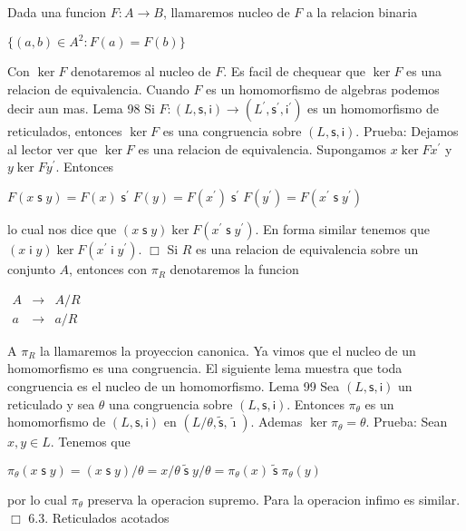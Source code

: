 Dada una funcion \(F:A\rightarrow B\), llamaremos nucleo de \(F\) a la relacion binaria

\(\displaystyle \{(a,b)\in A^{2}:F(a)=F(b)\} \)

Con \(\ker F\) denotaremos al nucleo de \(F\). Es facil de chequear que \(\ker F\) es una relacion de equivalencia. Cuando \(F\) es un homomorfismo de algebras podemos decir aun mas.
Lema 98 Si \(F:(L,\mathsf{s},\mathsf{i})\rightarrow (L^{\prime },\mathsf{s}^{\prime }, \mathsf{i}^{\prime })\) es un homomorfismo de reticulados, entonces \(\ker F\) es una congruencia sobre \((L,\mathsf{s},\mathsf{i})\).
Prueba: Dejamos al lector ver que \(\ker F\) es una relacion de equivalencia. Supongamos \(x\ker Fx^{\prime }\) y \(y\ker Fy^{\prime }\). Entonces

\(\displaystyle F(x\mathsf{\;s\;}y)=F(x)\mathsf{\;s^{\prime }\;}F(y)=F(x^{\prime })\mathsf{ \;s^{\prime }\;}F(y^{\prime })=F(x^{\prime }\mathsf{\;s\;}y^{\prime }) \)

lo cual nos dice que \((x\mathsf{\;s\;}y)\ker F(x^{\prime }\mathsf{\;s\;} y^{\prime })\). En forma similar tenemos que \((x\mathsf{\;i\;}y)\ker F(x^{\prime }\mathsf{\;i\;}y^{\prime })\). \(\Box\)
Si \(R\) es una relacion de equivalencia sobre un conjunto \(A\), entonces con \( \pi _{R}\) denotaremos la funcion

\(\displaystyle \begin{array}{ccc} A & \rightarrow & A/R \\ a & \rightarrow & a/R \end{array} \)

A \(\pi _{R}\) la llamaremos la proyeccion canonica. Ya vimos que el nucleo de un homomorfismo es una congruencia. El siguiente lema muestra que toda congruencia es el nucleo de un homomorfismo.
Lema 99 Sea \((L,\mathsf{s},\mathsf{i})\) un reticulado y sea \(\theta \) una congruencia sobre \((L,\mathsf{s},\mathsf{i})\). Entonces \(\pi _{\theta }\) es un homomorfismo de \((L,\mathsf{s},\mathsf{i})\) en \((L/\theta ,\mathsf{\tilde{ s}},\mathsf{\tilde{\imath}})\). Ademas \(\ker \pi _{\theta }=\theta \).
Prueba: Sean \(x,y\in L\). Tenemos que

\(\displaystyle \pi _{\theta }(x\mathsf{\;s\;}y)=(x\mathsf{\;s\;}y)/\theta =x/\theta \mathsf{ \;\tilde{s}\;}y/\theta =\pi _{\theta }(x)\mathsf{\;\tilde{s}\;}\pi _{\theta }(y) \)

por lo cual \(\pi _{\theta }\) preserva la operacion supremo. Para la operacion infimo es similar. \(\Box\)
6.3. Reticulados acotados


